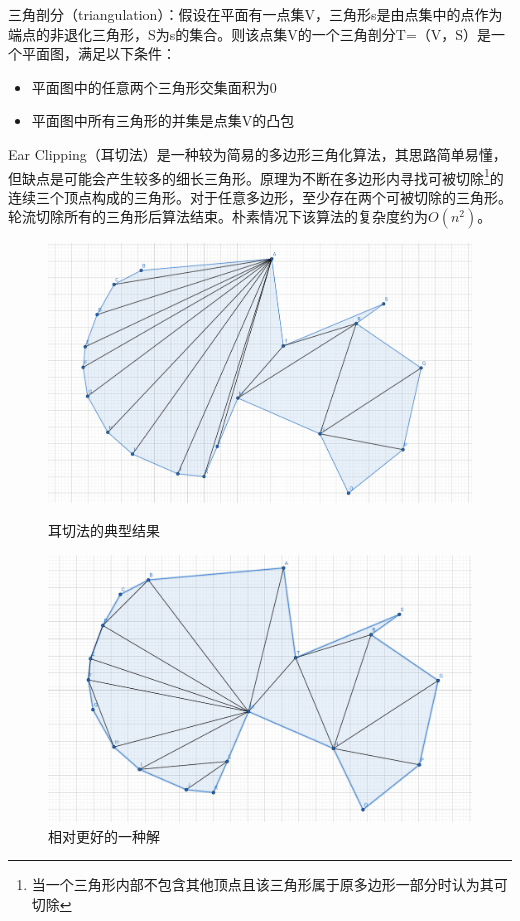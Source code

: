 三角剖分（triangulation）：假设在平面有一点集V，三角形s是由点集中的点作为端点的非退化三角形，S为s的集合。则该点集V的一个三角剖分T=（V，S）是一个平面图，满足以下条件：
\begin{itemize}
  \item 平面图中的任意两个三角形交集面积为0
  \item 平面图中所有三角形的并集是点集V的凸包
\end{itemize}

Ear Clipping（耳切法）是一种较为简易的多边形三角化算法，其思路简单易懂，但缺点是可能会产生较多的细长三角形。原理为不断在多边形内寻找可被切除\footnote[1]{当一个三角形内部不包含其他顶点且该三角形属于原多边形一部分时认为其可切除}的连续三个顶点构成的三角形。对于任意多边形，至少存在两个可被切除的三角形。轮流切除所有的三角形后算法结束。朴素情况下该算法的复杂度约为\(O(n^2)\)。

\begin{figure}[htbp]
  \centering
  \begin{minipage}{0.4\textwidth}
      \centering
      \includegraphics[width=\textwidth]
      {figures/ear clipping.png}
      \caption{耳切法的典型结果}
  \end{minipage}
  \begin{minipage}{0.4\textwidth}
      \centering
      \includegraphics[width=\textwidth]
      {figures/better.png}
      \caption{相对更好的一种解}
  \end{minipage}
\end{figure}

